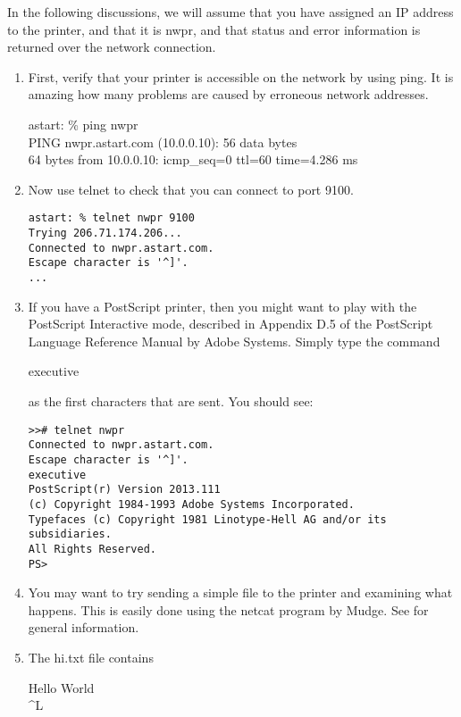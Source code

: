 \documentclass[a4paper]{article}
\begin{document}
In the following discussions,
we will assume that you have assigned an IP address to the printer,
and that it is {\ttfamily nwpr},
and that status and error information is returned over the network
connection.
\begin{enumerate}
\item First,
verify that your printer is accessible on the network by using
{\ttfamily ping}.
It is amazing how many problems are caused by erroneous
network addresses.
\begin{tscreen}
astart: \% ping nwpr \\ 
PING nwpr.astart.com (10.0.0.10): 56 data bytes \\ 
64 bytes from 10.0.0.10: icmp\_seq=0 ttl=60 time=4.286 ms 
\end{tscreen}
\item Now use
{\ttfamily telnet}
to check that you can connect to port 9100.
\begin{tscreen}
\begin{verbatim}
astart: % telnet nwpr 9100
Trying 206.71.174.206...
Connected to nwpr.astart.com.
Escape character is '^]'.
...
\end{verbatim}
\end{tscreen}
\item If you have a PostScript printer,
then you might want to play with the PostScript Interactive mode,
described in
Appendix D.5 of the PostScript Language Reference Manual
by Adobe Systems.
Simply type the command
\begin{tscreen}
executive
\end{tscreen}

as the first characters that are sent.
You should see:
\begin{tscreen}
\begin{verbatim}
>># telnet nwpr
Connected to nwpr.astart.com.
Escape character is '^]'.
executive
PostScript(r) Version 2013.111
(c) Copyright 1984-1993 Adobe Systems Incorporated.
Typefaces (c) Copyright 1981 Linotype-Hell AG and/or its subsidiaries.
All Rights Reserved.
PS>
\end{verbatim}
\end{tscreen}
\item You may want to try sending a simple file to the printer
and examining what happens.
This is easily done using the
{\ttfamily netcat}
program  by Mudge.
See
for general information.
\item The
{\ttfamily hi.txt}
file contains
\begin{tscreen}
Hello World \\ 
\^{}L 
\end{tscreen}


\end{enumerate}
\end{document}
